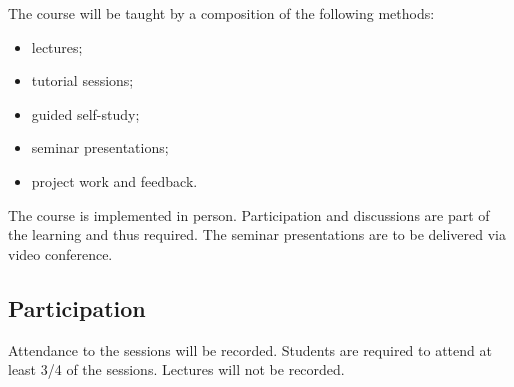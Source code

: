 \documentclass[a4paper]{artikel3}
\begin{document}
The course will be taught by a composition of the following methods: 
\begin{itemize}
    \item lectures;
    \item tutorial sessions; 	
    \item guided self-study;
    \item seminar presentations;
    \item project work and feedback.  
\end{itemize}

The course is implemented in person. Participation and discussions are part of the learning and thus required. 
The seminar presentations are to be delivered via video conference.
 


\subsection{Participation}

Attendance to the sessions will be recorded. Students are required to attend at least 3/4 of the sessions. Lectures will not be recorded.

%
%
\end{document}
